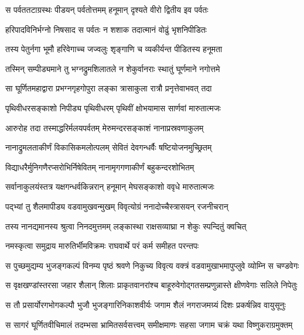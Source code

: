 \twolineshloka
{स पर्वततटाग्रस्थः पीडयन् पर्वतोत्तमम्}
{हनूमान् दृश्यते वीरो द्वितीय इव पर्वतः} %

\twolineshloka
{हरिपादविनिर्भग्नो निषसाद स पर्वतः}
{न शशाक तदात्मानं वोढुं भृशनिपीडितः} %

\twolineshloka
{तस्य पेतुर्नगा भूमौ हरिवेगाच्च जज्वलुः}
{शृङ्गाणि च व्यकीर्यन्त पीडितस्य हनूमता} %

\twolineshloka
{तस्मिन् सम्पीड्यमाने तु भग्नद्रुमशिलातले}
{न शेकुर्वानराः स्थातुं घूर्णमाने नगोत्तमे} %

\twolineshloka
{सा घूर्णितमहाद्वारा प्रभग्नगृहगोपुरा}
{लङ्का त्रासाकुला रात्रौ प्रनृत्तेवाभवत् तदा} %

\twolineshloka
{पृथिवीधरसङ्काशो निपीड्य पृथिवीधरम्}
{पृथिवीं क्षोभयामास सार्णवां मारुतात्मजः} %

\twolineshloka
{आरुरोह तदा तस्माद्धरिर्मलयपर्वतम्}
{मेरुमन्दरसङ्काशं नानाप्रस्रवणाकुलम्} %

\twolineshloka
{नानाद्रुमलताकीर्णं विकासिकमलोत्पलम्}
{सेवितं देवगन्धर्वैः षष्टियोजनमुच्छ्रितम्} %

\twolineshloka
{विद्याधरैर्मुनिगणैरप्सरोभिर्निषेवितम्}
{नानामृगगणाकीर्णं बहुकन्दरशोभितम्} %

\twolineshloka
{सर्वानाकुलयंस्तत्र यक्षगन्धर्वकिन्नरान्}
{हनूमान् मेघसङ्काशो ववृधे मारुतात्मजः} %

\twolineshloka
{पद्भ्यां तु शैलमापीड्य वडवामुखवन्मुखम्}
{विवृत्योग्रं ननादोच्चैस्त्रासयन् रजनीचरान्} %

\twolineshloka
{तस्य नानद्यमानस्य श्रुत्वा निनदमुत्तमम्}
{लङ्कास्था राक्षसव्याघ्रा न शेकुः स्पन्दितुं क्वचित्} %

\twolineshloka
{नमस्कृत्वा समुद्राय मारुतिर्भीमविक्रमः}
{राघवार्थे परं कर्म समीहत परन्तपः} %

\twolineshloka
{स पुच्छमुद्यम्य भुजङ्गकल्पं विनम्य पृष्ठं श्रवणे निकुच्य}
{विवृत्य वक्त्रं वडवामुखाभमापुप्लुवे व्योम्नि स चण्डवेगः} %

\twolineshloka
{स वृक्षखण्डांस्तरसा जहार शैलान् शिलाः प्राकृतवानरांश्च}
{बाहूरुवेगोद्गतसम्प्रणुन्नास्ते क्षीणवेगाः सलिले निपेतुः} %

\twolineshloka
{स तौ प्रसार्योरगभोगकल्पौ भुजौ भुजङ्गारिनिकाशवीर्यः}
{जगाम शैलं नगराजमग्र्यं दिशः प्रकर्षन्निव वायुसूनुः} %

\twolineshloka
{स सागरं घूर्णितवीचिमालं तदम्भसा भ्रामितसर्वसत्त्वम्}
{समीक्षमाणः सहसा जगाम चक्रं यथा विष्णुकराग्रमुक्तम्} %

